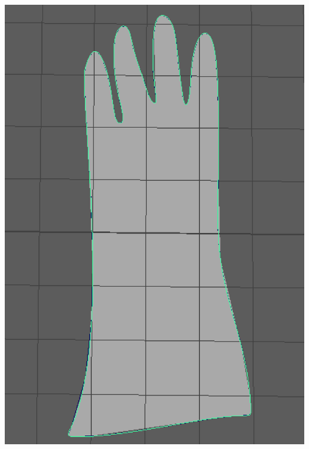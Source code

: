 \documentclass[a4paper, openright, twoside]{book}
\begin{document}
\begin{minipage}{\textwidth}
\begin{center}
\begin{minipage}{0.18\textwidth}
        \includegraphics[width=1\textwidth]{images/planar.png}
    \end{minipage}\hfill
    \begin{minipage}{0.18\textwidth}
        \centering

\end{minipage}
\end{center}
\end{minipage}
\end{document}
